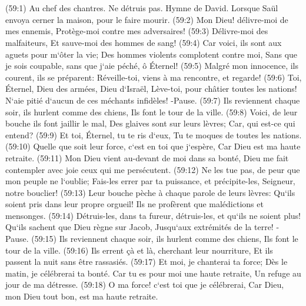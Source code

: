 \chapter{}

\verse (59:1) Au chef des chantres. Ne détruis pas. Hymne de David. Lorsque Saül envoya cerner la maison, pour le faire mourir. (59:2) Mon Dieu! délivre-moi de mes ennemis, Protège-moi contre mes adversaires! 
\verse (59:3) Délivre-moi des malfaiteurs, Et sauve-moi des hommes de sang! 
\verse (59:4) Car voici, ils sont aux aguets pour m`ôter la vie; Des hommes violents complotent contre moi, Sans que je sois coupable, sans que j`aie péché, ô Éternel! 
\verse (59:5) Malgré mon innocence, ils courent, ils se préparent: Réveille-toi, viens à ma rencontre, et regarde! 
\verse (59:6) Toi, Éternel, Dieu des armées, Dieu d`Israël, Lève-toi, pour châtier toutes les nations! N`aie pitié d`aucun de ces méchants infidèles! -Pause. 
\verse (59:7) Ils reviennent chaque soir, ils hurlent comme des chiens, Ils font le tour de la ville. 
\verse (59:8) Voici, de leur bouche ils font jaillir le mal, Des glaives sont sur leurs lèvres; Car, qui est-ce qui entend? 
\verse (59:9) Et toi, Éternel, tu te ris d`eux, Tu te moques de toutes les nations. 
\verse (59:10) Quelle que soit leur force, c`est en toi que j`espère, Car Dieu est ma haute retraite. 
\verse (59:11) Mon Dieu vient au-devant de moi dans sa bonté, Dieu me fait contempler avec joie ceux qui me persécutent. 
\verse (59:12) Ne les tue pas, de peur que mon peuple ne l`oublie; Fais-les errer par ta puissance, et précipite-les, Seigneur, notre bouclier! 
\verse (59:13) Leur bouche pèche à chaque parole de leurs lèvres: Qu`ils soient pris dans leur propre orgueil! Ils ne profèrent que malédictions et mensonges. 
\verse (59:14) Détruis-les, dans ta fureur, détruis-les, et qu`ils ne soient plus! Qu`ils sachent que Dieu règne sur Jacob, Jusqu`aux extrémités de la terre! -Pause. 
\verse (59:15) Ils reviennent chaque soir, ils hurlent comme des chiens, Ils font le tour de la ville. 
\verse (59:16) Ils errent çà et là, cherchant leur nourriture, Et ils passent la nuit sans être rassasiés. 
\verse (59:17) Et moi, je chanterai ta force; Dès le matin, je célébrerai ta bonté. Car tu es pour moi une haute retraite, Un refuge au jour de ma détresse. 
\verse (59:18) O ma force! c`est toi que je célébrerai, Car Dieu, mon Dieu tout bon, est ma haute retraite. 

\chapter{}

